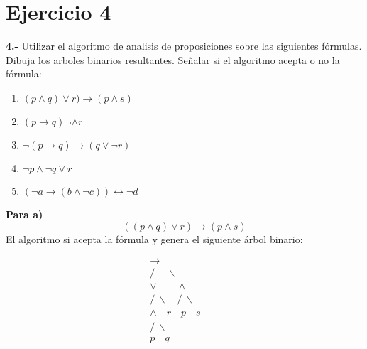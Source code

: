 \chapter*{Ejercicio 4}

\textbf{4.-} Utilizar el algoritmo de analisis de proposiciones sobre las siguientes fórmulas. Dibuja los arboles binarios resultantes. Señalar si el algoritmo acepta o no la fórmula: \newline 
\begin{center}
\begin{enumerate}
\renewcommand{\theenumi}{\alph{enumi}} %
    \item $(p \land q)\lor r) \rightarrow ( p \land s)$
    \item $(p \rightarrow q) \neg \land r$
    \item $ \neg (p \rightarrow q) \rightarrow (q \lor \neg r)$
    \item $\neg p \land \neg q \lor r$
    \item $(\neg a \rightarrow (b \land \neg c)) \leftrightarrow \neg d $
\end{enumerate}
\end{center}


\textbf{Para a)}
\[
((p \land q)\lor r) \rightarrow ( p \land s)
\]  \newline
El algoritmo si acepta la fórmula y genera el siguiente árbol binario: \newline

\begin{center}
\[
\begin{array}{c}
\rightarrow \\
/ \quad \ \backslash \\
\lor \quad  \quad  \land \\
/ \ \backslash \quad / \ \backslash \\
\land \quad r \quad p \quad s \\
/ \ \backslash \quad \quad \quad \quad \quad\\
p \quad q \quad \quad \quad \quad \quad  \\
\end{array}
\]
\end{center}


